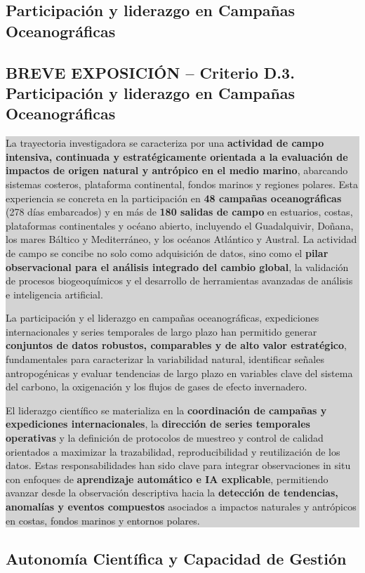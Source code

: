 \documentclass[11pt,a4paper]{article}
\newcommand{\breveexposicion}[2]{
    \subsection*{\color{darkgray}\textbf{BREVE EXPOSICIÓN -- #1}}
    \vspace{0.3em}
    \noindent\colorbox{lightgray}{%
        \begin{minipage}{0.97\textwidth}
        \vspace{0.5em}
        \color{darkgray}
        #2
        \vspace{0.5em}
        \end{minipage}
    }
    \vspace{1em}
}
\begin{document}
\subsection{Participación y liderazgo en Campañas Oceanográficas}
\breveexposicion{Criterio D.3. Participación y liderazgo en Campañas Oceanográficas}{
La trayectoria investigadora se caracteriza por una \textbf{actividad de campo intensiva, continuada y estratégicamente orientada a la evaluación de impactos de origen natural y antrópico en el medio marino}, abarcando sistemas costeros, plataforma continental, fondos marinos y regiones polares. Esta experiencia se concreta en la participación en \textbf{48 campañas oceanográficas} (278 días embarcados) y en más de \textbf{180 salidas de campo} en estuarios, costas, plataformas continentales y océano abierto, incluyendo el Guadalquivir, Doñana, los mares Báltico y Mediterráneo, y los océanos Atlántico y Austral. La actividad de campo se concibe no solo como adquisición de datos, sino como el \textbf{pilar observacional para el análisis integrado del cambio global}, la validación de procesos biogeoquímicos y el desarrollo de herramientas avanzadas de análisis e inteligencia artificial.

La participación y el liderazgo en campañas oceanográficas, expediciones internacionales y series temporales de largo plazo han permitido generar \textbf{conjuntos de datos robustos, comparables y de alto valor estratégico}, fundamentales para caracterizar la variabilidad natural, identificar señales antropogénicas y evaluar tendencias de largo plazo en variables clave del sistema del carbono, la oxigenación y los flujos de gases de efecto invernadero.

El liderazgo científico se materializa en la \textbf{coordinación de campañas y expediciones internacionales}, la \textbf{dirección de series temporales operativas} y la definición de protocolos de muestreo y control de calidad orientados a maximizar la trazabilidad, reproducibilidad y reutilización de los datos. Estas responsabilidades han sido clave para integrar observaciones in situ con enfoques de \textbf{aprendizaje automático e IA explicable}, permitiendo avanzar desde la observación descriptiva hacia la \textbf{detección de tendencias, anomalías y eventos compuestos} asociados a impactos naturales y antrópicos en costas, fondos marinos y entornos polares.
}
\clearpage


\subsection{Autonomía Científica y Capacidad de Gestión}
\end{document}
